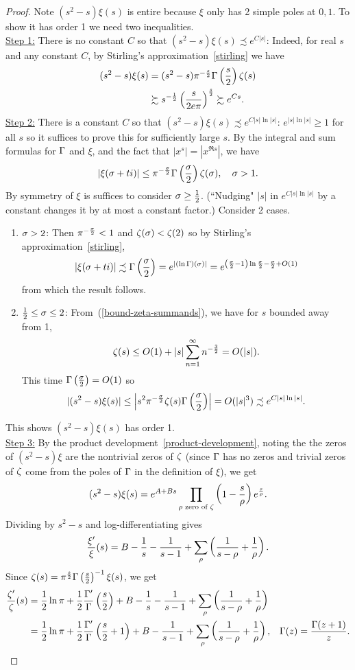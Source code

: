 \begin{proof}
Note $(s^2-s)\xi(s)$ is entire because $\xi$ only has 2 simple poles at $0,1$. To show it has order 1 we need two inequalities.\\

\noindent \underline{Step 1:} There is no constant $C$ so that $(s^2-s)\xi(s)\precsim e^{C|s|}$: Indeed, for real $s$ and any constant $C$, by Stirling's approximation~\ref{stirling} we have
\begin{align*}
(s^2-s)\xi(s)&=(s^2-s)\pi^{-\frac s2}\Gamma\left( {\frac{s}{2}} \right)\zeta(s)\\
&\succsim s^{-\frac{1}{2}}\left( {\frac{s}{2e\pi}} \right)^{\frac s2}
\succsim e^{Cs}.
\end{align*}
\noindent\underline{Step 2:} There is a constant $C$ so that $(s^2-s)\xi(s)\precsim e^{C|s|\ln|s|}$: $e^{|s|\ln|s|}\ge1$ for all $s$ so it suffices to prove this for sufficiently large $s$. By the integral and sum formulas for $\Gamma$ and $\xi$, and the fact that $|x^s|=|x^{\Re s}|$, we have
\[
|\xi(\sigma+ti)|\le \pi^{-\frac{\sigma}{2}}\Gamma\left( {\frac{\sigma}{2}} \right)\zeta(\sigma),\quad \sigma>1.
\]
By symmetry of $\xi$ is suffices to consider $\sigma\ge \frac{1}{2}$. (``Nudging" $|s|$ in $e^{C|s|\ln|s|}$ by a constant changes it by at most a constant factor.)
Consider 2 cases.
\begin{enumerate}
\item
$\sigma>2$: Then $\pi^{-\frac{\sigma}{2}}<1$ and $\zeta(\sigma)<\zeta(2)$ so by Stirling's approximation~\ref{stirling},
\[
|\xi(\sigma+ti)|\precsim
\Gamma\left( {\frac{\sigma}{2}} \right)
=e^{|(\ln\Gamma)(\sigma)|}=e^{\left( {\frac{\sigma}2-1} \right)\ln\frac{\sigma}2-\frac{\sigma}2+O(1)}
\]
from which the result follows.
\item
$\frac12\le \sigma\le 2$: From~(\ref{bound-zeta-summands}), we have for $s$ bounded away from 1,
\[
\zeta(s)\le O(1)+|s| \sum_{n=1}^{\infty} n^{-\frac 32}=O(|s|).
\]
This time $\Gamma\left( {\frac{\sigma}{2}} \right)=O(1)$ so
\[
|(s^2-s)\xi(s)|\le \left| {
s^2\pi^{-\frac{\sigma}2}\zeta(s)\Gamma\left( {\frac{\sigma}{2}} \right)} \right|
=O(|s|^3)\precsim e^{C|s|\ln|s|}.
\]
\end{enumerate}
This shows $(s^2-s)\xi(s)$ has order 1.\\

\noindent\underline{Step 3:} By the product development~\ref{product-development}, noting the the zeros of $(s^2-s)\xi$ are the nontrivial zeros of $\zeta$ (since $\Gamma$ has no zeros and trivial zeros of $\zeta$ come from the poles of $\Gamma$ in the definition of $\xi$), we get
\[
(s^2-s)\xi(s)=e^{A+Bs}\prod_{\rho\text{ zero of }\zeta}\left( {1-\frac{s}{\rho}} \right)e^{\frac s{\rho}}.
\]
Dividing by $s^2-s$ and log-differentiating gives
\[
\frac{\xi'}{\xi}(s)=B-\frac{1}{s}-\frac{1}{s-1}+\sum_{\rho} \left( {\frac{1}{s-\rho}+\frac{1}{\rho}} \right).
\]
Since $\zeta(s)=\pi^{\frac s2}\Gamma\left( {\frac{s}{2}} \right)^{-1}\xi(s)$, we get
\begin{align*}
\frac{\zeta'}{\zeta}(s)&=\frac{1}{2}\ln\pi +\frac{1}{2}\frac{\Gamma'}{\Gamma}\left( {\frac{s}{2}} \right)+B-\frac{1}{s}-\frac{1}{s-1}+\sum_{\rho} \left( {\frac{1}{s-\rho}+\frac{1}{\rho}} \right)\\
&=\frac{1}{2}\ln\pi +\frac{1}{2}\frac{\Gamma'}{\Gamma}\left( {\frac{s}{2}+1} \right)+B-\frac{1}{s-1}+\sum_{\rho} \left( {\frac{1}{s-\rho}+\frac{1}{\rho}} \right),&\Gamma(z)=\frac{\Gamma(z+1)}{z}.\qedhere
\end{align*}
\end{proof}
